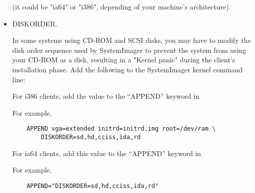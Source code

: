 \begin{itemize}

(it could be "ia64" or "i386", depending of your machine's architecture).



\item DISKORDER.

In some systems using CD-ROM and SCSI disks, you may have to modify
the disk order sequence used by SystemImager to prevent the system from using
your CD-ROM as a disk, resulting in a "Kernel panic" during the
client's installation phase.  Add the following to the SystemImager
kernel command line:


For i386 clients, add the value to the ``APPEND'' keyword in


For example,

\begin{verbatim}
    APPEND vga=extended initrd=initrd.img root=/dev/ram \
        DISKORDER=sd,hd,cciss,ida,rd
\end{verbatim}

For ia64 clients, add this value to the ``APPEND'' keyword in


For example,

\begin{verbatim}
    APPEND="DISKORDER=sd,hd,cciss,ida,rd"
\end{verbatim}


\end{itemize}

